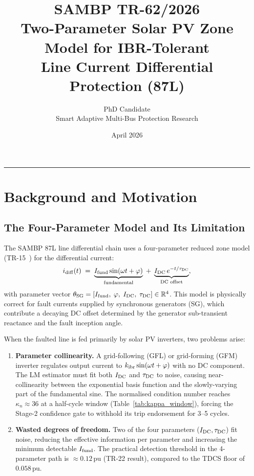 \documentclass[11pt, a4paper]{article}
\title{\textbf{SAMBP TR-62/2026}\\[4pt]
       \large Two-Parameter Solar PV Zone Model for IBR-Tolerant\\
       Line Current Differential Protection (87L)}
\author{PhD Candidate\\[2pt]
        \small Smart Adaptive Multi-Bus Protection Research}
\date{April 2026}
\newcommand{\pu}{\,\text{pu}}
\newcommand{\kn}{\kappa_n}
\newcommand{\thsg}{\theta_{\rm SG}}
\newcommand{\kIBR}{k_{\rm ibr}}
\begin{document}
\maketitle
\tableofcontents
\vspace{6pt}\hrule\vspace{10pt}

\section{Background and Motivation}
\label{sec:background}

\subsection{The Four-Parameter Model and Its Limitation}

The SAMBP 87L line differential chain uses a four-parameter reduced zone model
(TR-15~\cite{SAMBP_TR15}) for the differential current:
\begin{equation}
  i_{\rm diff}(t) \;=\;
  \underbrace{I_{\rm fund}\sin(\omega t + \varphi)}_{\text{fundamental}}
  \;+\;
  \underbrace{I_{\rm DC}\,e^{-t/\tau_{\rm DC}}}_{\text{DC offset}},
  \label{eq:4param}
\end{equation}
with parameter vector
$\thsg = [I_{\rm fund},\;\varphi,\;I_{\rm DC},\;\tau_{\rm DC}] \in \mathbb{R}^4$.
This model is physically correct for fault currents supplied by synchronous
generators (SG), which contribute a decaying DC offset determined by the
generator sub-transient reactance and the fault inception angle.

When the faulted line is fed primarily by solar PV inverters, two problems
arise:
\begin{enumerate}
  \item \textbf{Parameter collinearity.}  A grid-following (GFL) or grid-forming
    (GFM) inverter regulates output current to $\kIBR\sin(\omega t + \varphi)$
    with no DC component.  The LM estimator must fit both $I_{\rm DC}$ and
    $\tau_{\rm DC}$ to noise, causing near-collinearity between the exponential
    basis function and the slowly-varying part of the fundamental sine.  The
    normalised condition number reaches $\kn \approx 36$ at a half-cycle window
    (Table~\ref{tab:kappa_window}), forcing the Stage-2 confidence gate to
    withhold its trip endorsement for 3--5 cycles.

  \item \textbf{Wasted degrees of freedom.}  Two of the four parameters
    ($I_{\rm DC}, \tau_{\rm DC}$) fit noise, reducing the effective information
    per parameter and increasing the minimum detectable $I_{\rm fund}$.
    The practical detection threshold in the 4-parameter path is $\approx 0.12\pu$
    (TR-22 result), compared to the TDCS floor of $0.058\pu$.
\end{enumerate}
\end{document}
